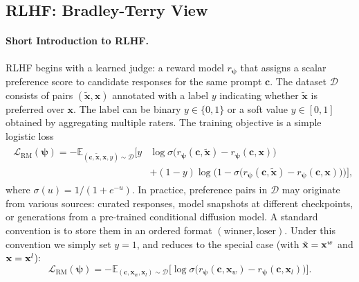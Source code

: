 \subsection{RLHF: Bradley-Terry View}\label{subsec:rlhf-bradley-terry}


\paragraph{Short Introduction to RLHF.}
RLHF begins with a learned judge: a reward model $r_{\bm\psi}$ that assigns a scalar preference score to candidate responses for the same prompt $\mathbf c$. The dataset $\mathcal D$ consists of pairs $(\tilde{\mathbf x},\mathbf x)$ annotated with a label $y$ indicating whether $\tilde{\mathbf x}$ is preferred over $\mathbf x$. The label can be binary $y\in\{0,1\}$ or a soft value $y\in[0,1]$ obtained by aggregating multiple raters. The training objective is a simple logistic loss
\begin{align}\label{eq:rm-emp}
\begin{aligned}
    \mathcal L_{\mathrm{RM}}(\bm\psi)
=
- \mathbb E_{(\mathbf c,\tilde{\mathbf x},\mathbf x,y)\sim\mathcal D}
\Big[
y &\log \sigma \big(r_{\bm\psi}(\mathbf c,\tilde{\mathbf x})-r_{\bm\psi}(\mathbf c,\mathbf x)\big)
\\ &+(1-y)\log \big(1-\sigma \big(r_{\bm\psi}(\mathbf c,\tilde{\mathbf x})-r_{\bm\psi}(\mathbf c,\mathbf x)\big)\big)
\Big],
\end{aligned}
\end{align}
where $\sigma(u)=1/(1+e^{-u})$. In practice, preference pairs in $\mathcal D$ may originate from various sources: curated responses, model snapshots at different checkpoints, or generations from a pre-trained conditional diffusion model.  
A standard convention is to store them in an ordered format $(\text{winner}, \text{loser})$.  
Under this convention we simply set $y=1$, and  reduces to the special case (with $\tilde{{\mathbf{x}}} = {\mathbf{x}}^w$ and ${\mathbf{x}} = {\mathbf{x}}^l$):
\begin{equation}\label{eq:rm-bt}
\mathcal L_{\mathrm{RM}}(\bm\psi)
=
- \mathbb E_{(\mathbf c,\mathbf x_w,\mathbf x_l)\sim\mathcal D}
\Big[\log \sigma \big(r_{\bm\psi}(\mathbf c,\mathbf x_w)-r_{\bm\psi}(\mathbf c,\mathbf x_l)\big)\Big].
\end{equation}



